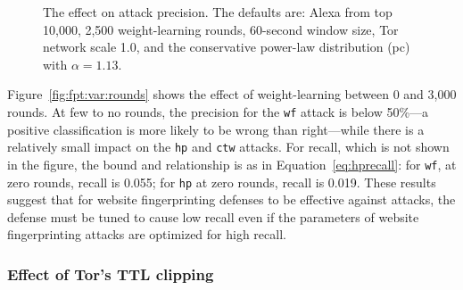 \begin{figure}[t]
\centering
{}
\caption{The effect on attack precision. The defaults are: Alexa from top 10,000,
2,500 weight-learning rounds,
60-second window size, Tor network scale 1.0, and the conservative
power-law distribution (pc) with $\alpha=1.13$.}
\label{fig:fpt:var}
\end{figure}


Figure~\ref{fig:fpt:var:rounds} shows the effect of weight-learning between 0
and 3,000 rounds.  At few to no rounds, the precision for the
\texttt{wf} attack is below 50\%---a positive classification is more likely to
be wrong than right---while there is a relatively small impact on the
\texttt{hp} and \texttt{ctw} attacks.
For recall, which is not shown in the figure, the bound and relationship is
as in Equation~\ref{eq:hprecall}: for \texttt{wf}, at zero rounds, recall is
0.055; for \texttt{hp} at zero rounds, recall is 0.019. These results suggest
that for website fingerprinting defenses to be effective against \name attacks,
the defense must be tuned to cause low recall even if the parameters of
website fingerprinting attacks are optimized for high recall.

\subsubsection{Effect of Tor's TTL clipping}

